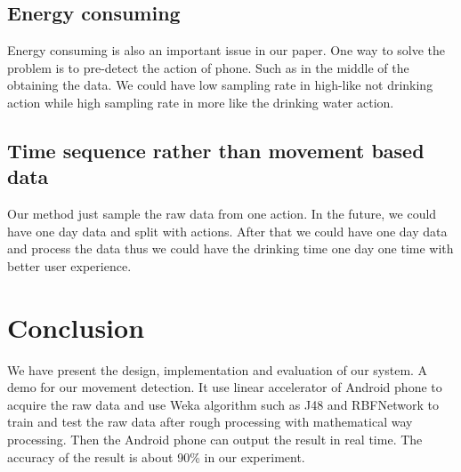 \documentclass[12pt,twocolumn]{article}
\begin{document}
\subsection{Energy consuming}
Energy consuming is also an important issue in our paper. One way to solve the problem is to pre-detect the action of phone. Such as in the middle of the obtaining the data. We could have low sampling rate in high-like not drinking action while high sampling rate in more like the drinking water action.

\subsection{Time sequence rather than movement based data}
Our method just sample the raw data from one action. In the future, we could have one day data and split with actions. After that we could have one day data and process the data thus we could have the drinking time one day one time with better user experience.

\section{Conclusion}
We have present the design, implementation and evaluation of our system. A demo for our movement detection. It use linear accelerator of Android phone to acquire the raw data and use Weka algorithm such as J48 and RBFNetwork to train and test the raw data after rough processing with mathematical way processing. Then the Android phone can output the result in real time. The accuracy of the result is about 90\% in our experiment. 




\end{document}
